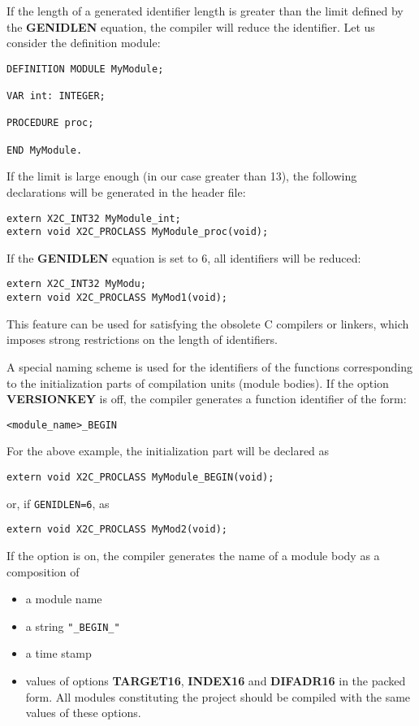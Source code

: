 If  the length of a generated  identifier  length  is greater than the limit
defined  by the {\bf GENIDLEN} equation, the compiler will reduce
the identifier.
Let us consider the definition module:
\begin{verbatim}
DEFINITION MODULE MyModule;

VAR int: INTEGER;

PROCEDURE proc;

END MyModule.
\end{verbatim}

If the limit is large enough (in our case greater than 13),
the following declarations will be generated in the header file:
\begin{verbatim}
extern X2C_INT32 MyModule_int;
extern void X2C_PROCLASS MyModule_proc(void);
\end{verbatim}

If the {\bf GENIDLEN} equation is set to 6, all identifiers
will be reduced:
\begin{verbatim}
extern X2C_INT32 MyModu;
extern void X2C_PROCLASS MyMod1(void);
\end{verbatim}

This feature can be used for satisfying the obsolete C compilers or
linkers, which imposes strong restrictions on the length of
identifiers.

A special naming scheme is used for the identifiers of the
functions corresponding to the initialization parts of
compilation units (module bodies). If the option {\bf VERSIONKEY}
is off, the compiler generates a function identifier of the form:
\begin{verbatim}
<module_name>_BEGIN
\end{verbatim}

For the above example, the initialization part will be declared as
\begin{verbatim}
extern void X2C_PROCLASS MyModule_BEGIN(void);
\end{verbatim}
or, if {\tt GENIDLEN=6}, as
\begin{verbatim}
extern void X2C_PROCLASS MyMod2(void);
\end{verbatim}

If the option is on, the compiler generates the name of
a module body as a composition of
\begin{itemize}
\item a module name
\item a string \verb+"_BEGIN_"+
\item a time stamp
\item values of options {\bf TARGET16}, {\bf INDEX16} and {\bf
      DIFADR16} in the packed form.
      All modules constituting the project
      should be compiled with the same values of these options.
\end{itemize}

